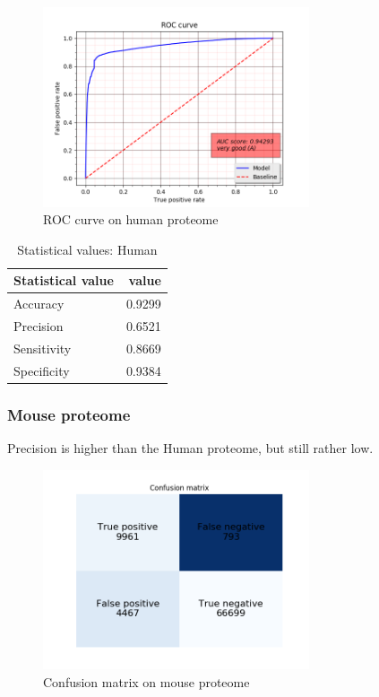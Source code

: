 \begin{figure}[H]
\center
\includegraphics[width=0.7\textwidth]{pictures/human_roc.png}
\caption{\label{fig:human_roc}ROC curve on human proteome}
\end{figure}

\begin{table}[H]
\centering
\begin{tabular}{l | r} %
Statistical value & value\\\hline
Accuracy & 0.9299 \\
Precision & 0.6521 \\
Sensitivity & 0.8669 \\
Specificity & 0.9384 \\
\end{tabular}
\caption{\label{tab:human_stat_table}Statistical values: Human}
\end{table}

\subsubsection{Mouse proteome}

Precision is higher than the Human proteome, but still rather low.

\begin{figure}[H]
\center
\includegraphics[width=0.7\textwidth]{pictures/mouse_cm.png}
\caption{\label{fig:mouse_cm}Confusion matrix on mouse proteome}
\end{figure}

